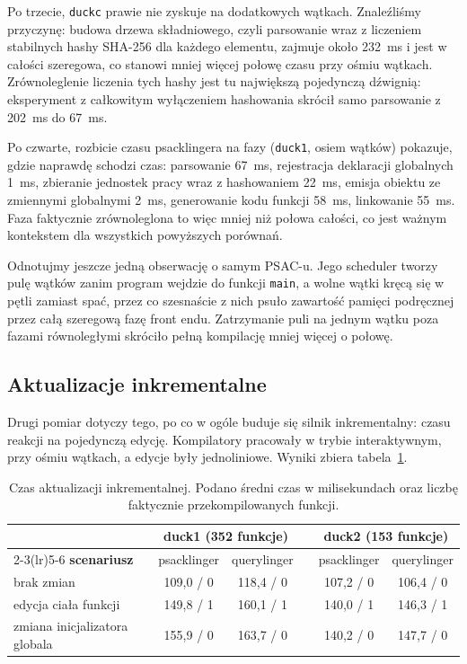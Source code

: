 \documentclass[11pt,a4paper]{article}
\begin{document}
Po trzecie, \texttt{duckc} prawie nie zyskuje na dodatkowych wątkach.
Znaleźliśmy przyczynę: budowa drzewa składniowego, czyli parsowanie wraz
z liczeniem stabilnych hashy SHA-256 dla każdego elementu, zajmuje około 232~ms
i jest w całości szeregowa, co stanowi mniej więcej połowę czasu przy ośmiu
wątkach. Zrównoleglenie liczenia tych hashy jest tu największą pojedynczą
dźwignią: eksperyment z całkowitym wyłączeniem hashowania skrócił samo
parsowanie z 202~ms do 67~ms.

Po czwarte, rozbicie czasu psacklingera na fazy (\texttt{duck1}, osiem wątków)
pokazuje, gdzie naprawdę schodzi czas: parsowanie 67~ms, rejestracja deklaracji
globalnych 1~ms, zbieranie jednostek pracy wraz z hashowaniem 22~ms, emisja
obiektu ze zmiennymi globalnymi 2~ms, generowanie kodu funkcji 58~ms, linkowanie
55~ms. Faza faktycznie zrównoleglona to więc mniej niż połowa całości, co jest
ważnym kontekstem dla wszystkich powyższych porównań.

Odnotujmy jeszcze jedną obserwację o samym PSAC-u. Jego scheduler tworzy pulę
wątków zanim program wejdzie do funkcji \texttt{main}, a wolne wątki kręcą się
w pętli zamiast spać, przez co szesnaście z nich psuło zawartość pamięci
podręcznej przez całą szeregową fazę front endu. Zatrzymanie puli na jednym wątku
poza fazami równoległymi skróciło pełną kompilację mniej więcej o połowę.

\subsection{Aktualizacje inkrementalne}

Drugi pomiar dotyczy tego, po co w ogóle buduje się silnik inkrementalny: czasu
reakcji na pojedynczą edycję. Kompilatory pracowały w trybie interaktywnym, przy
ośmiu wątkach, a edycje były jednoliniowe. Wyniki zbiera
tabela~\ref{tab:cieple}.

\begin{table}[htbp]
\centering
\caption{Czas aktualizacji inkrementalnej. Podano średni czas w milisekundach
oraz liczbę faktycznie przekompilowanych funkcji.}
\label{tab:cieple}
\small
\begin{tabular}{@{}l cc c cc@{}}
\toprule
& \multicolumn{2}{c}{\textbf{duck1} (352 funkcje)} & &
  \multicolumn{2}{c}{\textbf{duck2} (153 funkcje)} \\
\cmidrule(lr){2-3}\cmidrule(lr){5-6}
\textbf{scenariusz} & psacklinger & querylinger & & psacklinger & querylinger \\
\midrule
brak zmian                    & 109,0 / 0 & 118,4 / 0 & & 107,2 / 0 & 106,4 / 0 \\
edycja ciała funkcji          & 149,8 / 1 & 160,1 / 1 & & 140,0 / 1 & 146,3 / 1 \\
zmiana inicjalizatora globala & 155,9 / 0 & 163,7 / 0 & & 140,2 / 0 & 147,7 / 0 \\
\bottomrule
\end{tabular}
\end{table}
\end{document}
